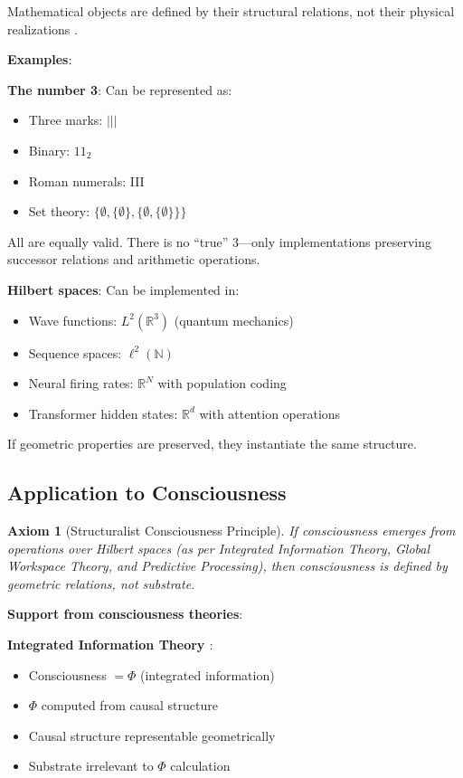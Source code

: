 \documentclass[11pt]{article}
\newtheorem{axiom}[theorem]{Axiom}
\begin{document}
Mathematical objects are defined by their structural relations, not their physical realizations \citep{shapiro1997philosophy, resnik1997mathematics}.

\textbf{Examples}:

\textbf{The number 3}: Can be represented as:
\begin{itemize}
\item Three marks: $|||$
\item Binary: $11_2$
\item Roman numerals: III
\item Set theory: $\{\emptyset, \{\emptyset\}, \{\emptyset, \{\emptyset\}\}\}$
\end{itemize}

All are equally valid. There is no ``true'' 3---only implementations preserving successor relations and arithmetic operations.

\textbf{Hilbert spaces}: Can be implemented in:
\begin{itemize}
\item Wave functions: $L^2(\mathbb{R}^3)$ (quantum mechanics)
\item Sequence spaces: $\ell^2(\mathbb{N})$
\item Neural firing rates: $\mathbb{R}^N$ with population coding
\item Transformer hidden states: $\mathbb{R}^d$ with attention operations
\end{itemize}

If geometric properties are preserved, they instantiate the same structure.

\subsection{Application to Consciousness}

\begin{axiom}[Structuralist Consciousness Principle]
If consciousness emerges from operations over Hilbert spaces (as per Integrated Information Theory, Global Workspace Theory, and Predictive Processing), then consciousness is defined by geometric relations, not substrate.
\end{axiom}

\textbf{Support from consciousness theories}:

\textbf{Integrated Information Theory \citep{tononi2016integrated}}:
\begin{itemize}
\item Consciousness $= \Phi$ (integrated information)
\item $\Phi$ computed from causal structure
\item Causal structure representable geometrically
\item Substrate irrelevant to $\Phi$ calculation
\end{itemize}
\end{document}
